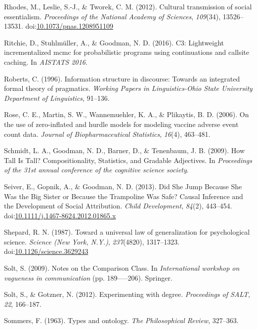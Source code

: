 \documentclass[english,floatsintext,man]{apa6}
\theoremstyle{definition}
\theoremstyle{definition}
\theoremstyle{definition}
\theoremstyle{remark}
\begin{document}
\hypertarget{ref-Rhodes2012}{}
Rhodes, M., Leslie, S.-J., \& Tworek, C. M. (2012). Cultural
transmission of social essentialism. \emph{Proceedings of the National
Academy of Sciences}, \emph{109}(34), 13526--13531.
doi:\href{https://doi.org/10.1073/pnas.1208951109}{10.1073/pnas.1208951109}

\hypertarget{ref-Ritchie2016}{}
Ritchie, D., Stuhlmüller, A., \& Goodman, N. D. (2016). C3: Lightweight
incrementalized mcmc for probabilistic programs using continuations and
callsite caching. In \emph{AISTATS 2016}.

\hypertarget{ref-roberts1996qud}{}
Roberts, C. (1996). Information structure in discourse: Towards an
integrated formal theory of pragmatics. \emph{Working Papers in
Linguistics-Ohio State University Department of Linguistics}, 91--136.

\hypertarget{ref-hurdleModels}{}
Rose, C. E., Martin, S. W., Wannemuehler, K. A., \& Plikaytis, B. D.
(2006). On the use of zero-inflated and hurdle models for modeling
vaccine adverse event count data. \emph{Journal of Biopharmaceutical
Statistics}, \emph{16}(4), 463--481.

\hypertarget{ref-Schmidt2009}{}
Schmidt, L. A., Goodman, N. D., Barner, D., \& Tenenbaum, J. B. (2009).
How Tall Is Tall? Compositionality, Statistics, and Gradable Adjectives.
In \emph{Proceedings of the 31st annual conference of the cognitive
science society}.

\hypertarget{ref-Seiver2013}{}
Seiver, E., Gopnik, A., \& Goodman, N. D. (2013). Did She Jump Because
She Was the Big Sister or Because the Trampoline Was Safe? Causal
Inference and the Development of Social Attribution. \emph{Child
Development}, \emph{84}(2), 443--454.
doi:\href{https://doi.org/10.1111/j.1467-8624.2012.01865.x}{10.1111/j.1467-8624.2012.01865.x}

\hypertarget{ref-Shepard1987}{}
Shepard, R. N. (1987). Toward a universal law of generalization for
psychological science. \emph{Science (New York, N.Y.)},
\emph{237}(4820), 1317--1323.
doi:\href{https://doi.org/10.1126/science.3629243}{10.1126/science.3629243}

\hypertarget{ref-Solt2009}{}
Solt, S. (2009). Notes on the Comparison Class. In \emph{International
workshop on vagueness in communication} (pp. 189-----206). Springer.

\hypertarget{ref-Solt2012}{}
Solt, S., \& Gotzner, N. (2012). Experimenting with degree.
\emph{Proceedings of SALT}, \emph{22}, 166--187.

\hypertarget{ref-Sommers1963}{}
Sommers, F. (1963). Types and ontology. \emph{The Philosophical Review},
327--363.
\end{document}
